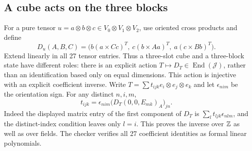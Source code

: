 \documentclass[11pt,reqno]{amsart}
\theoremstyle{definition}\newtheorem{definition}[theorem]{Definition}
\theoremstyle{remark}\newtheorem{remark}[theorem]{Remark}
\begin{document}
\subsection{A cube acts on the three blocks}
For a pure tensor $u=a\otimes b\otimes c\in V_0\otimes V_1\otimes V_2$, use
oriented cross products and define
\begin{equation}\label{eq:Du}
 D_u(A,B,C)=
 \big(b(a\times Cc)^T,\ c(b\times Aa)^T,\ a(c\times Bb)^T\big).
\end{equation}
Extend linearly in all 27 tensor entries. Thus a three-slot cube and a
three-block state have different roles: there is an explicit action
$T\mapsto D_T\in\operatorname{End}(\mathcal J)$, rather than an identification
based only on equal dimensions. This action is injective with an explicit
coefficient inverse. Write $T=\sum t_{ijk}e_i\otimes e_j\otimes e_k$ and let
$\epsilon_{nim}$ be the orientation sign. For any distinct $n,i,m$,
\begin{equation}\label{eq:Dinverse}
 t_{ijk}=\epsilon_{nim}
 \big(D_T(0,0,E_{mk})_A\big)_{jn}.
\end{equation}
Indeed the displayed matrix entry of the first component of $D_T$ is
$\sum_l t_{ljk}\epsilon_{nlm}$, and the distinct-index condition leaves only
$l=i$. This proves the inverse over $\mathbb Z$ as well as over fields. The checker
verifies all 27 coefficient identities as formal linear polynomials.
\end{document}
